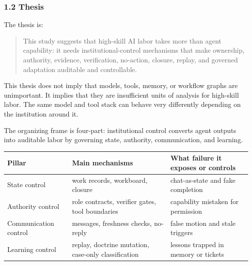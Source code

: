 \documentclass[
]{article}
\newcounter{none} %
\begin{document}
\subsubsection{1.2 Thesis}\label{thesis}

The thesis is:

\begin{quote}
This study suggests that high-skill AI labor takes more than agent capability: it needs institutional-control mechanisms that make ownership, authority, evidence, verification, no-action, closure, replay, and governed adaptation auditable and controllable.
\end{quote}

This thesis does not imply that models, tools, memory, or workflow graphs are unimportant. It implies that they are insufficient units of analysis for high-skill labor. The same model and tool stack can behave very differently depending on the institution around it.

The organizing frame is four-part: institutional control converts agent outputs into auditable labor by governing state, authority, communication, and learning.

{\def\LTcaptype{none} %
\begin{longtable}[]{@{}
  >{\raggedright\arraybackslash}p{}
  >{\raggedright\arraybackslash}p{}
  >{\raggedright\arraybackslash}p{}@{}}
\toprule\noalign{}
\begin{minipage}[b]{\linewidth}\raggedright
Pillar
\end{minipage} & \begin{minipage}[b]{\linewidth}\raggedright
Main mechanisms
\end{minipage} & \begin{minipage}[b]{\linewidth}\raggedright
What failure it exposes or controls
\end{minipage} \\
\midrule\noalign{}
\endhead
\bottomrule\noalign{}
\endlastfoot
State control & work records, workboard, closure & chat-as-state and fake completion \\
Authority control & role contracts, verifier gates, tool boundaries & capability mistaken for permission \\
Communication control & messages, freshness checks, no-reply & false motion and stale triggers \\
Learning control & replay, doctrine mutation, case-only classification & lessons trapped in memory or tickets \\
\end{longtable}
}
\end{document}
